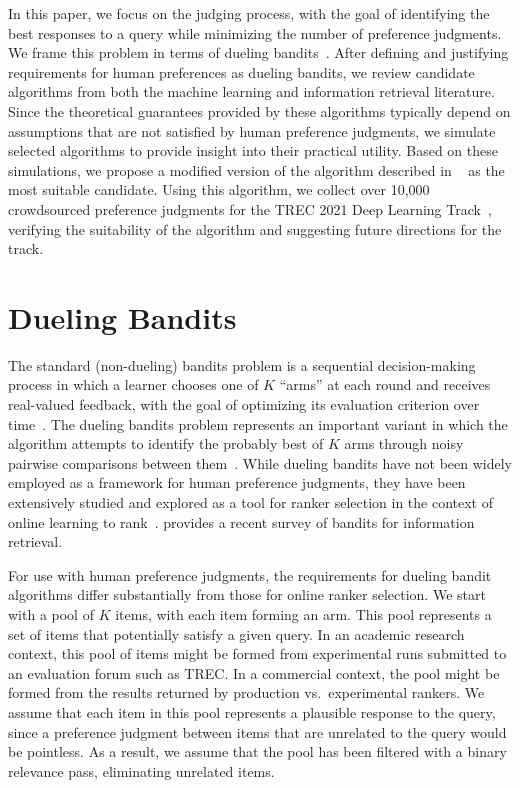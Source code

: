 In this paper, we focus on the judging process, with the goal of identifying the best responses to a query while minimizing the number of preference judgments. We frame this problem in terms of dueling bandits~\cite{yue11,yue12,rucb,mergerucb,bbmh21,mergedts,ll18}. After defining and justifying requirements for human preferences as dueling bandits, we review candidate algorithms from both the machine learning and information retrieval literature. Since the theoretical guarantees provided by these algorithms typically depend on assumptions that are not satisfied by human preference judgments, we simulate selected algorithms to provide insight into their practical utility. Based on these simulations, we propose a modified version of the algorithm described in ~\citet{cvs21} as the most suitable candidate. Using this algorithm, we collect over 10,000 crowdsourced preference judgments for the TREC 2021 Deep Learning Track~\cite{DL21}, verifying the suitability of the algorithm and suggesting future directions for the track.

\section{Dueling Bandits}
\label{sec:require}

The standard (non-dueling) bandits problem is a sequential decision-making process in which a learner chooses one of $K$ ``arms'' at each round and receives real-valued feedback, with the goal of optimizing its evaluation criterion over time~\cite{bandits19}. The dueling bandits problem represents an important variant in which the algorithm attempts to identify the probably best of $K$ arms through noisy pairwise comparisons between them~\cite{yue11,yue12,rucb,mergerucb,bbmh21,mergedts,ll18}. While dueling bandits have not been widely employed as a framework for human preference judgments, they have been extensively studied and explored as a tool for ranker selection in the context of online learning to rank~\cite{bbmh21}. \citet{bandits19} provides a recent survey of bandits for information retrieval.

For use with human preference judgments, the requirements for dueling bandit algorithms differ substantially from those for online ranker selection. We start with a pool of $K$ items, with each item forming an arm. This pool represents a set of items that potentially satisfy a given query. In an academic research context, this pool of items might be formed from experimental runs submitted to an evaluation forum such as TREC. In a commercial context, the pool might be formed from the results returned by production vs.\ experimental rankers. We assume that each item in this pool represents a plausible response to the query, since a preference judgment between items that are unrelated to the query would be pointless. As a result, we assume that the pool has been filtered with a binary relevance pass, eliminating unrelated items.

